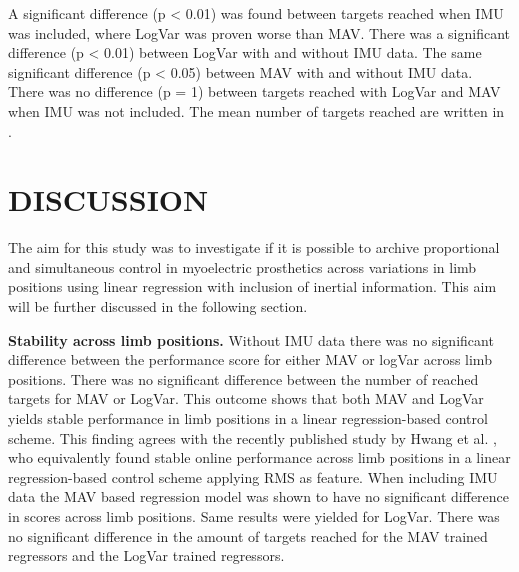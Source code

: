 \begin{multicols}{2}
	
	
	A significant difference (p < 0.01) was found between targets reached when IMU was included, where LogVar was proven worse than MAV. There was a significant difference (p < 0.01) between LogVar with and without IMU data. The same significant difference (p < 0.05) between MAV with and without IMU data. There was no difference (p = 1) between targets reached with LogVar and MAV when IMU was not included. The mean number of targets reached are written in .
	
\section*{DISCUSSION}%
	
	The aim for this study was to investigate if it is possible to archive proportional and simultaneous control in myoelectric prosthetics across variations in limb positions using linear regression with inclusion of inertial information. This aim will be further discussed in the following section.
	
%		
\textbf{Stability across limb positions.} Without IMU data there was no significant difference between the performance score for either MAV or logVar across limb positions. There was no significant difference between the number of reached targets for MAV or LogVar. This outcome shows that both MAV and LogVar yields stable performance in limb positions in a linear regression-based control scheme. This finding agrees with the recently published study by Hwang et al. \cite{Hwang2017}, who equivalently found stable online performance across limb positions in a linear regression-based control scheme applying RMS as feature.
When including IMU data the MAV based regression model was shown to have no significant difference in scores across limb positions. Same results were yielded for LogVar. There was no significant difference in the amount of targets reached for the MAV trained regressors and the LogVar trained regressors. 


\end{multicols}
